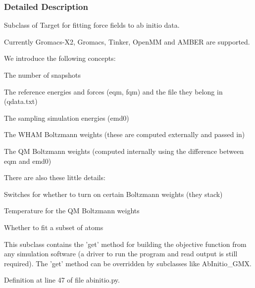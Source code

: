 \subsubsection{\-Detailed \-Description}
\-Subclass of \-Target for fitting force fields to ab initio data. 

\-Currently \-Gromacs-\/\-X2, \-Gromacs, \-Tinker, \-Open\-M\-M and \-A\-M\-B\-E\-R are supported.

\-We introduce the following concepts\-:
\begin{DoxyItemize}
\item \-The number of snapshots
\item \-The reference energies and forces (eqm, fqm) and the file they belong in (qdata.\-txt)
\item \-The sampling simulation energies (emd0)
\item \-The \-W\-H\-A\-M \-Boltzmann weights (these are computed externally and passed in)
\item \-The \-Q\-M \-Boltzmann weights (computed internally using the difference between eqm and emd0)
\end{DoxyItemize}

\-There are also these little details\-:
\begin{DoxyItemize}
\item \-Switches for whether to turn on certain \-Boltzmann weights (they stack)
\item \-Temperature for the \-Q\-M \-Boltzmann weights
\item \-Whether to fit a subset of atoms
\end{DoxyItemize}

\-This subclass contains the 'get' method for building the objective function from any simulation software (a driver to run the program and read output is still required). \-The 'get' method can be overridden by subclasses like \-Ab\-Initio\-\_\-\-G\-M\-X. 

\-Definition at line 47 of file abinitio.\-py.




